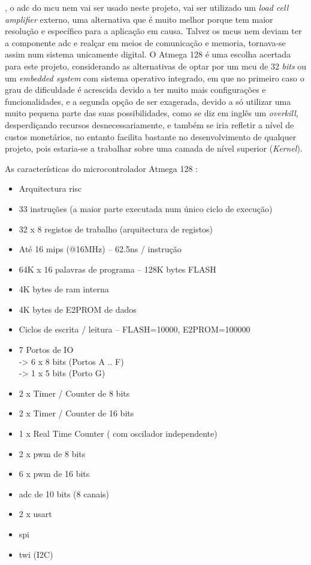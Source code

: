 , o \ac{adc} do \acs{mcu} nem vai ser usado neste projeto, vai ser utilizado um \textit{load cell amplifier} externo, uma alternativa que é muito melhor porque tem maior resolução e específico para a aplicação em causa.
\emptyline
Talvez os \acsp{mcu} nem deviam ter a componente \acs{adc} e realçar em meios de comunicação e memoria, tornava-se assim num sistema unicamente digital.
O Atmega 128 é uma escolha acertada para este projeto, considerando as alternativas de optar por um \ac{mcu} de 32 \textit{bits} ou um \textit{embedded system} com sistema operativo integrado, em que no primeiro caso o grau de dificuldade é acrescida devido a ter muito mais configurações e funcionalidades, e a segunda opção de ser exagerada, devido a só utilizar uma muito pequena parte das suas possibilidades, como se diz em inglês um \textit{overkill}, desperdiçando recursos desnecessariamente, e também se iria refletir a nível de custos monetários, no entanto facilita bastante no desenvolvimento de qualquer projeto, pois estaria-se a trabalhar sobre uma camada de nível superior (\textit{Kernel}).
\emptyline
\begin{minipage}{\linewidth}
As características do microcontrolador Atmega 128 :
\normalsize
\begin{itemize}	
	\setlength\itemsep{-0.3em}
	\item Arquitectura \acs{risc}
	\item 33 instruções (a maior parte executada num único ciclo de execução)
	\item 32 x 8 registos de trabalho (arquitectura de registos)
	\item Até 16 \acs{mips} (@16MHz) – 62.5ns / instrução
	\item 64K x 16 palavras de programa – 128K bytes FLASH
	\item 4K bytes de \acs{ram} interna
	\item 4K bytes de E2PROM de dados
	\item Ciclos de escrita / leitura – FLASH=10000, E2PROM=100000
	\item 7 Portos de IO \\
		\hspace*{.5cm}	-> 6 x 8 bits (Portos A .. F) \\
		\hspace*{.5cm}	-> 1 x 5 bits (Porto G)
	\item 2 x Timer / Counter de 8 bits
	\item 2 x Timer / Counter de 16 bits
	\item 1 x Real Time Counter ( com oscilador independente)
	\item 2 x \acs{pwm} de 8 bits
	\item 6 x \acs{pwm} de 16 bits
	\item \acs{adc} de 10 bits (8 canais)
	\item 2 x \acs{usart}
	\item \acs{spi}
	\item \acs{twi} (I2C)
\end{itemize}
\end{minipage}

